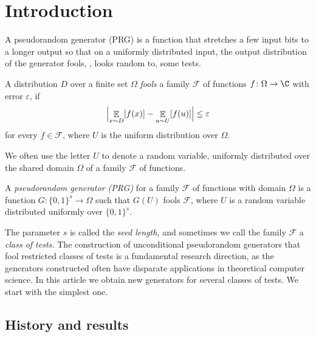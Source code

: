 \documentclass{toc}
\newcommand{\zo}{\{0,1\}}
\def\eps{\varepsilon}
\def\calF{\mathcal{F}}
\DeclareMathOperator*{\E}{\mathbb{E}}                 %
\begin{document}
%
%
%

\section{Introduction}

%
%
%
%
%
%

%
%
A pseudorandom generator (PRG) is a function that stretches a few input bits to a longer output so that on a uniformly distributed input, the output distribution of the generator fools, \ie, looks random to, some tests.

%
%
%
\begin{definition}
A distribution $D$  %
over a finite set $\Omega$   %
\emph{fools} a
%
family $\calF$ of functions    %
%
%
%
$f \colon\Omega\to\C$  %
%
%
with error $\eps$, if
  \[
    \Bigl| \E_{x\sim D}[f(x)] - \E_{u\sim U}[f(u)] \Bigr| \le \eps 
  \]
  for every $f\in \calF$, where $U$ is
the %
  uniform distribution
  over $\Omega$.   %
\end{definition}
We often
%
use    %
the letter $U$ to denote a random variable,
%
%
uniformly distributed  %
over the 
%
shared domain $\Omega$ of a 
%
%
family $\calF$ of functions.  %
%
%
%
%
\begin{definition}
A \emph{pseudorandom generator (PRG)} for a family
%
$\calF$ of functions with domain $\Omega$
is a function 
%
$G\colon\zo^s \to \Omega$   %
such that $G(U)$ fools $\calF$, where $U$ is a random variable distributed
%
uniformly over $\zo^s$.  %
\end{definition}
The parameter $s$ is called the
\emph{seed length,}  %
and sometimes we call the family $\calF$ a
\emph{class of tests.} %
The construction of unconditional pseudorandom generators that fool restricted
classes of tests is a fundamental research direction, as the generators
constructed  %
%
often have 
%
disparate applications
in theoretical computer science.  %
%
%
In this
%
article  %
we obtain new generators for several classes of tests.
We start with the simplest one.  %

\subsection{History and results}  %
\end{document}
